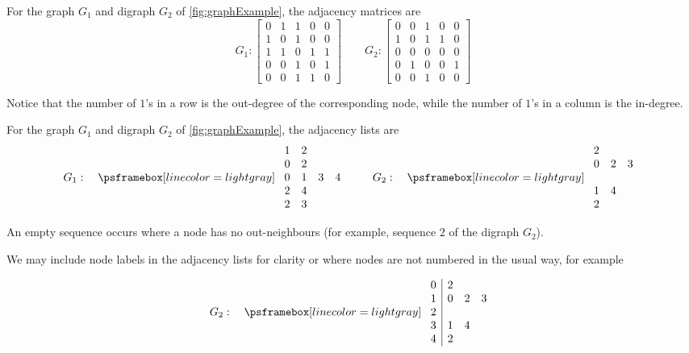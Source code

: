 \begin{Example}
For the graph $G_1$ and digraph $G_2$ of \cref{fig:graphExample}, 
the adjacency matrices are
$$
G_1: 
\left[
\begin{matrix}
0 & 1 & 1 & 0 & 0 \\
1 & 0 & 1 & 0 & 0 \\
1 & 1 & 0 & 1 & 1 \\
0 & 0 & 1 & 0 & 1 \\
0 & 0 & 1 & 1 & 0 
\end{matrix}
\right]
\qquad 
G_2: 
\left[
\begin{matrix}
0 & 0 & 1 & 0 & 0 \\
1 & 0 & 1 & 1 & 0 \\
0 & 0 & 0 & 0 & 0 \\
0 & 1 & 0 & 0 & 1 \\
0 & 0 & 1 & 0 & 0 
\end{matrix}
\right]
$$

Notice that the number of $1$'s in a row is the out-degree
 of the corresponding node, while the number of $1$'s in a column is the in-degree.
\end{Example}
 
\begin{Example}
For the graph $G_1$ and digraph $G_2$ of \cref{fig:graphExample}, 
the adjacency lists are
$$
G_1: \quad
\AdjLists{
\begin{array}{cccc}
1 & 2  \\
0 & 2 \\
0 & 1 & 3 & 4  \\
2 & 4  \\
2 & 3  \\
\end{array}
}
 \qquad
G_2: 
\quad 
\AdjLists{
\begin{array}{ccc}
2  \\
0 & 2 & 3  \\
\\
1 & 4  \\
2 \\
\end{array}
}
$$

An empty sequence occurs where a node has no out-neighbours (for example, sequence $2$ of the digraph $G_2$). 

We may include node labels in the adjacency lists for clarity or where nodes are not numbered in the usual way, for example

$$
G_2: 
\quad 
\AdjLists{
\begin{array}{c|ccc}
0 & 2  \\
1 & 0 & 2 & 3  \\
2  \\
3 & 1 & 4  \\
4& 2 \\
\end{array}
}
$$

\end{Example}


